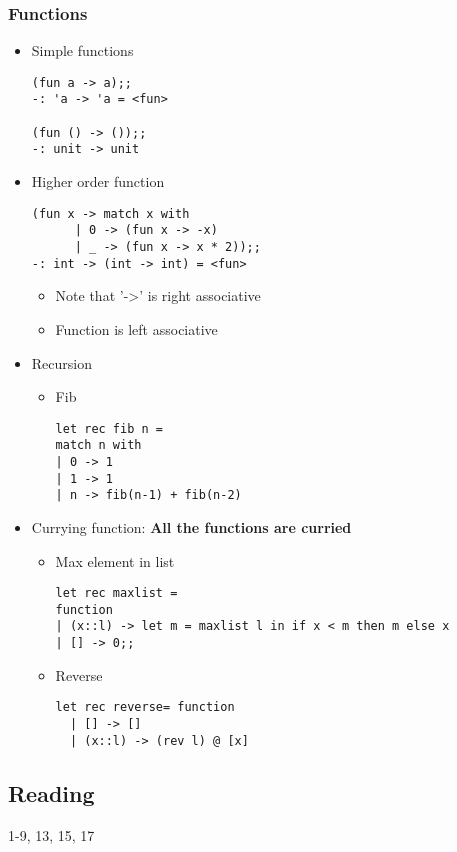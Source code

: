 \documentclass[11pt]{article}
\begin{document}
\subsubsection{Functions}
\label{sec:orgd7761ad}
\begin{itemize}
\item Simple functions
\begin{verbatim}
(fun a -> a);;
-: 'a -> 'a = <fun>

(fun () -> ());;
-: unit -> unit
\end{verbatim}

\item Higher order function
\begin{verbatim}
(fun x -> match x with
	  | 0 -> (fun x -> -x)
	  | _ -> (fun x -> x * 2));;
-: int -> (int -> int) = <fun>
\end{verbatim}

\begin{itemize}
\item Note that '->' is right associative
\item Function is left associative
\end{itemize}

\item Recursion
\begin{itemize}
\item Fib
\begin{verbatim}
let rec fib n =
match n with
| 0 -> 1
| 1 -> 1
| n -> fib(n-1) + fib(n-2)
\end{verbatim}
\end{itemize}

\item Currying function: \textbf{All the functions are curried}
\begin{itemize}
\item Max element in list
\begin{verbatim}
let rec maxlist =
function 
| (x::l) -> let m = maxlist l in if x < m then m else x
| [] -> 0;;
\end{verbatim}

\item Reverse
\begin{verbatim}
let rec reverse= function
  | [] -> []
  | (x::l) -> (rev l) @ [x]
\end{verbatim}
\end{itemize}
\end{itemize}


\subsection{Reading}
\label{sec:org0067397}
1-9, 13, 15, 17
\end{document}
